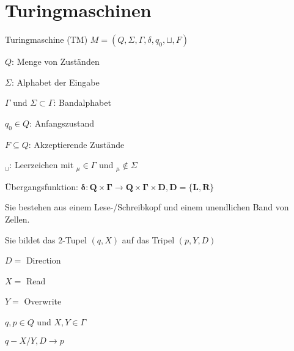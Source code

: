 \graphicspath{{images/}}

\section*{Turingmaschinen}

\begin{theorem}{Turingmaschine (TM)} $M=\left(Q, \Sigma, \Gamma, \delta, q_{0}, \sqcup , F\right)$

    \begin{minipage}{0.45\linewidth}
        $Q$: Menge von Zuständen

        $\Sigma$: Alphabet der Eingabe

        $\Gamma$ und $\Sigma \subset \Gamma$: Bandalphabet
    \end{minipage}
    \begin{minipage}{0.55\linewidth}
        $q_{0} \in Q$: Anfangszustand

        $F \subseteq Q$: Akzeptierende Zustände

        ${ }_{\sqcup }$: Leerzeichen mit ${ }_{\mu} \in \Gamma$ und ${ }_{\mu} \notin \Sigma$
    \end{minipage}

    Übergangsfunktion: $\boldsymbol{\delta}: \boldsymbol{Q} \times \boldsymbol{\Gamma} \rightarrow \boldsymbol{Q} \times \boldsymbol{\Gamma} \times \boldsymbol{D}, \boldsymbol{D}=\{\boldsymbol{L}, \boldsymbol{R}\}$
    
    \vspace{1mm}

    Sie bestehen aus einem Lese-/Schreibkopf und einem unendlichen Band von Zellen.

    \vspace{1mm}

    Sie bildet das 2-Tupel $(q, X)$ auf das Tripel $(p, Y, D)$

    \begin{minipage}{0.45\linewidth}
        $D=$ Direction

        $X=$ Read

        $Y=$ Overwrite
    \end{minipage}
    \begin{minipage}{0.5\linewidth}
       $q, p \in Q$ und $X, Y \in \Gamma$

       \emph{$q-X / Y, D \rightarrow p$}
    \end{minipage}

\end{theorem}

